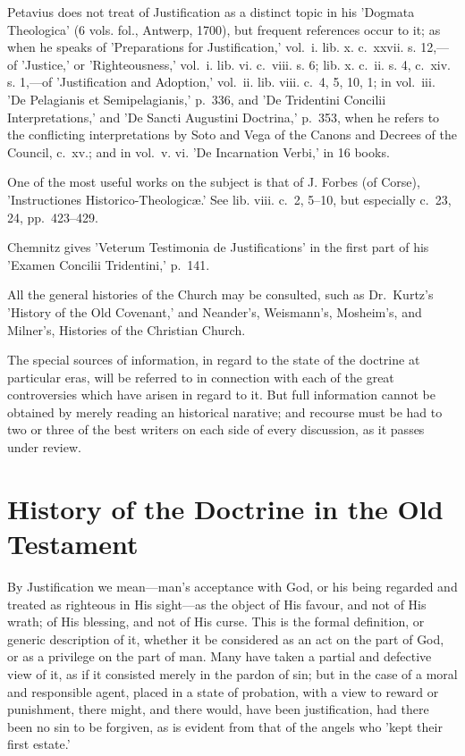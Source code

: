 \documentclass[
]{book}
\begin{document}
{  Petavius does not treat of Justification as a distinct topic in his 'Dogmata Theologica' (6 vols. fol., Antwerp, 1700), but frequent references occur to it; as when he speaks of 'Preparations for Justification,' vol.~i. lib. x. c.~xxvii. s. 12,---of 'Justice,' or 'Righteousness,' vol.~i. lib. vi. c.~viii. s. 6; lib. x. c.~ii. s. 4, c.~xiv. s. 1,---of 'Justification and Adoption,' vol.~ii. lib. viii. c.~4, 5, 10, 1; in vol.~iii. 'De Pelagianis et Semipelagianis,' p.~336, and 'De Tridentini Concilii Interpretations,' and 'De Sancti Augustini Doctrina,' p.~353, when he refers to the conflicting interpretations by Soto and Vega of the Canons and Decrees of the Council, c.~xv.; and in vol.~v. vi. 'De Incarnation Verbi,' in 16 books.

  One of the most useful works on the subject is that of J. Forbes (of Corse), 'Instructiones Historico-Theologicæ.' See lib. viii. c.~2, 5--10, but especially c.~23, 24, pp.~423--429.

  Chemnitz gives 'Veterum Testimonia de Justifications' in the first part of his 'Examen Concilii Tridentini,' p.~141.

  All the general histories of the Church may be consulted, such as Dr.~Kurtz's 'History of the Old Covenant,' and Neander's, Weismann's, Mosheim's, and Milner's, Histories of the Christian Church.

  The special sources of information, in regard to the state of the doctrine at particular eras, will be referred to in connection with each of the great controversies which have arisen in regard to it. But full information cannot be obtained by merely reading an historical narative; and recourse must be had to two or three of the best writers on each side of every discussion, as it passes under review.}

\hypertarget{history-of-the-doctrine-in-the-old-testament}{%
\chapter{History of the Doctrine in the Old Testament}\label{history-of-the-doctrine-in-the-old-testament}}

By Justification we mean---man's acceptance with God, or his being regarded and treated as righteous in His sight---as the object of His favour, and not of His wrath; of His blessing, and not of His curse. This is the formal definition, or generic description of it, whether it be considered as an act on the part of God, or as a privilege on the part of man. Many have taken a partial and defective view of it, as if it consisted merely in the pardon of sin; but in the case of a moral and responsible agent, placed in a state of probation, with a view to reward or punishment, there might, and there would, have been justification, had there been no sin to be forgiven, as is evident from that of the angels who 'kept their first estate.'
\end{document}
